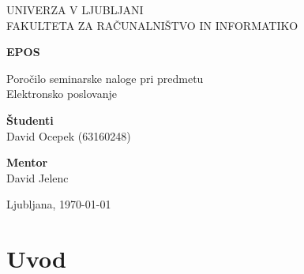\documentclass[a4paper,12pt]{report}
\newcommand{\naslov}     {EPOS}
\newcommand{\prviavtor}  {David Ocepek}
\newcommand{\prviindeks} {63160248}
\newcommand{\kraj}       {Ljubljana}
\begin{document}
\begin{titlepage}
	\begin{center}
	{UNIVERZA V LJUBLJANI\\[10pt] 
	FAKULTETA ZA RAČUNALNIŠTVO IN INFORMATIKO}

	\vspace{65mm}

	{\Large\textbf{\naslov}}

	\vspace{10mm}

	{\large Poročilo seminarske naloge pri predmetu\\[10pt] Elektronsko poslovanje}

	\vfill
	\vspace{60mm}

\hspace{20mm}
\begin{minipage}[t]{70mm}
	{\bf Študenti}\\
	{\prviavtor} ({\prviindeks})\\ 
\end{minipage}
\begin{minipage}[t]{50mm}
	{\bf Mentor}\\
	David Jelenc
\end{minipage}

	\vspace{35mm}

	{	\kraj, \today}
	\end{center}
\end{titlepage}


\tableofcontents


\chapter{Uvod}
\end{document}
